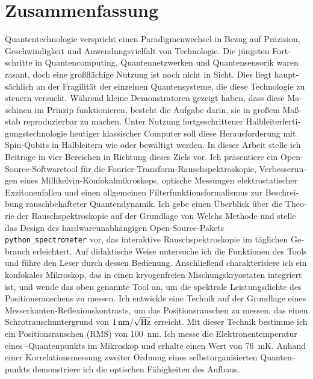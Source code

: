 \documentclass[a4paper,10pt]{article}
\begin{document}
\section*{Zusammenfassung}
\begin{german}
    Quantentechnologie verspricht einen Paradigmenwechsel in Bezug auf Präzision, Geschwindigkeit und Anwendungsvielfalt von Technologie.
    Die jüngsten Fortschritte in Quantencomputing, Quantennetzwerken und Quantensensorik waren rasant, doch eine großflächige Nutzung ist noch nicht in Sicht.
    Dies liegt hauptsächlich an der Fragilität der einzelnen Quantensysteme, die diese Technologie zu steuern versucht.
    Während kleine Demonstratoren gezeigt haben, dass diese Maschinen im Prinzip funktionieren, besteht die Aufgabe darin, sie in großem Maßstab reproduzierbar zu machen.
    Unter Nutzung fortgeschrittener Halbleiterfertigungstechnologie heutiger klassischer Computer soll diese Herausforderung mit Spin-Qubits in Halbleitern wie  oder  bewältigt werden.
    In dieser Arbeit stelle ich Beiträge in vier Bereichen in Richtung dieses Ziels vor.
    Ich präsentiere ein Open-Source-Softwaretool für die Fourier-Transform-Rauschspektroskopie, Verbesserungen eines Millikelvin-Konfokalmikroskops, optische Messungen elektrostatischer Exzitonenfallen und einen allgemeinen Filterfunktionsformalismus zur Beschreibung rauschbehafteter Quantendynamik.
    Ich gebe einen Überblick über die Theorie der Rauschspektroskopie auf der Grundlage von Welchs Methode und stelle das Design des hardwareunabhängigen Open-Source-Pakets \texttt{python\_spectrometer} vor, das interaktive Rauschspektroskopie im täglichen Gebrauch erleichtert.
    Auf didaktische Weise untersuche ich die Funktionen des Tools und führe den Leser durch dessen Bedienung.
    Anschließend charakterisiere ich ein konfokales Mikroskop, das in einen kryogenfreien Mischungskryostaten integriert ist, und wende das oben genannte Tool an, um die spektrale Leistungsdichte des Positionsrauschens zu messen.
    Ich entwickle eine Technik auf der Grundlage eines Messerkanten-Reflexionskontrasts, um das Positionsrauschen zu messen, das einen Schrotrauschuntergrund von $\qty{1}{\nano\meter\per\sqrt{\hertz}}$ erreicht.
    Mit dieser Technik bestimme ich ein Positionsrauschen (RMS) von \qty{100}{\nano\meter}.
    Ich messe die Elektronentemperatur eines -Quantenpunkts im Mikroskop und erhalte einen Wert von \qty{76}{\milli\kelvin}.
    Anhand einer Korrelationsmessung zweiter Ordnung eines selbstorganisierten Quantenpunkts demonstriere ich die optischen Fähigkeiten des Aufbaus.

\end{german}
\end{document}
